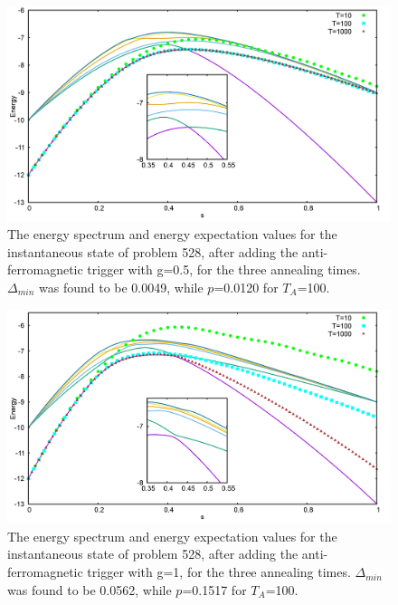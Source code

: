\documentclass[../main.tex]{subfiles}
\begin{document}
\begin{figure}[H]
\centering 
\includegraphics[scale=0.24]{528_s12_A_g0.png}
\caption{The energy spectrum and energy expectation values for the instantaneous state of problem 528, after adding the anti-ferromagnetic trigger with g=0.5, for the three annealing times. $\Delta_{min}$ was found to be 0.0049, while $p$=0.0120 for $T_A$=100. }
\label{fig:a7}
\end{figure}
\begin{figure}[H]
\centering 
\includegraphics[scale=0.24]{528_s12_A_g1.png}
\caption{The energy spectrum and energy expectation values for the instantaneous state of problem 528, after adding the anti-ferromagnetic trigger with g=1, for the three annealing times. $\Delta_{min}$ was found to be 0.0562, while $p$=0.1517 for $T_A$=100. }
\label{fig:a8}
\end{figure}
\end{document}
